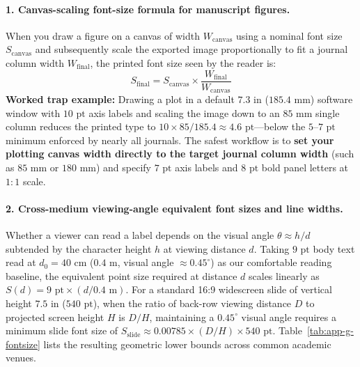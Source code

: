 \paragraph{1. Canvas-scaling font-size formula for manuscript figures.}
When you draw a figure on a canvas of width $W_{\text{canvas}}$ using a nominal font size $S_{\text{canvas}}$ and subsequently scale the exported image proportionally to fit a journal column width $W_{\text{final}}$, the printed font size seen by the reader is:
\[
  S_{\text{final}} = S_{\text{canvas}} \times \frac{W_{\text{final}}}{W_{\text{canvas}}}
\]
\textbf{Worked trap example:} Drawing a plot in a default $7.3\text{ in}$ ($185.4\text{ mm}$) software window with $10\text{ pt}$ axis labels and scaling the image down to an $85\text{ mm}$ single column reduces the printed type to $10 \times 85 / 185.4 \approx 4.6\text{ pt}$---below the $5\text{--}7\text{ pt}$ minimum enforced by nearly all journals. The safest workflow is to \textbf{set your plotting canvas width directly to the target journal column width} (such as $85\text{ mm}$ or $180\text{ mm}$) and specify $7\text{ pt}$ axis labels and $8\text{ pt}$ bold panel letters at $1{:}1$ scale.

\paragraph{2. Cross-medium viewing-angle equivalent font sizes and line widths.}
Whether a viewer can read a label depends on the visual angle $\theta \approx h/d$ subtended by the character height $h$ at viewing distance $d$. Taking $9\text{ pt}$ body text read at $d_0 = 40\text{ cm}$ ($0.4\text{ m}$, visual angle $\approx 0.45^\circ$) as our comfortable reading baseline, the equivalent point size required at distance $d$ scales linearly as $S(d) = 9\text{ pt} \times (d / 0.4\text{ m})$. For a standard 16:9 widescreen slide of vertical height $7.5\text{ in}$ ($540\text{ pt}$), when the ratio of back-row viewing distance $D$ to projected screen height $H$ is $D/H$, maintaining a $0.45^\circ$ visual angle requires a minimum slide font size of $S_{\text{slide}} \approx 0.00785 \times (D/H) \times 540\text{ pt}$. Table~\ref{tab:app-g-fontsize} lists the resulting geometric lower bounds across common academic venues.

